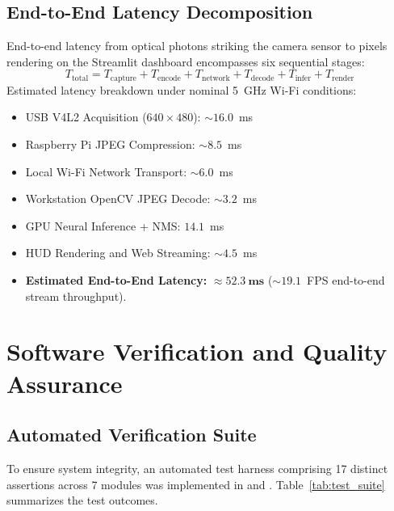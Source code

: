 \documentclass[12pt,a4paper,oneside]{report}
\begin{document}
\section{End-to-End Latency Decomposition}
End-to-end latency from optical photons striking the camera sensor to pixels rendering on the Streamlit dashboard encompasses six sequential stages:
\begin{equation}
T_{\text{total}} = T_{\text{capture}} + T_{\text{encode}} + T_{\text{network}} + T_{\text{decode}} + T_{\text{infer}} + T_{\text{render}}
\end{equation}
Estimated latency breakdown under nominal 5~GHz Wi-Fi conditions:
\begin{itemize}
  \item USB V4L2 Acquisition ($640\times480$): $\sim 16.0$~ms
  \item Raspberry Pi JPEG Compression: $\sim 8.5$~ms
  \item Local Wi-Fi Network Transport: $\sim 6.0$~ms
  \item Workstation OpenCV JPEG Decode: $\sim 3.2$~ms
  \item GPU Neural Inference + NMS: $14.1$~ms
  \item HUD Rendering and Web Streaming: $\sim 4.5$~ms
  \item \textbf{Estimated End-to-End Latency:} $\approx \mathbf{52.3~\text{ms}}$ ($\sim 19.1$~FPS end-to-end stream throughput).
\end{itemize}


\chapter{Software Verification and Quality Assurance}
\label{ch:qa}

\section{Automated Verification Suite}
To ensure system integrity, an automated test harness comprising 17 distinct assertions across 7 modules was implemented in  and . Table~\ref{tab:test_suite} summarizes the test outcomes.
\end{document}
